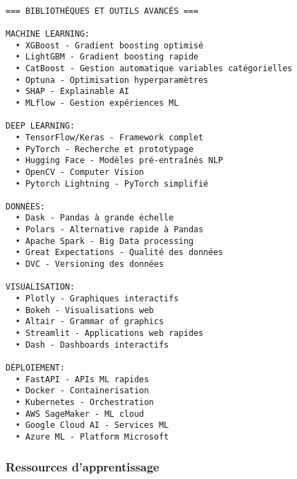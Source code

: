 \documentclass[11pt]{article}
\begin{document}
    \begin{Verbatim}[commandchars=\\\{\}]

=== BIBLIOTHÈQUES ET OUTILS AVANCÉS ===

MACHINE LEARNING:
  • XGBoost - Gradient boosting optimisé
  • LightGBM - Gradient boosting rapide
  • CatBoost - Gestion automatique variables catégorielles
  • Optuna - Optimisation hyperparamètres
  • SHAP - Explainable AI
  • MLflow - Gestion expériences ML

DEEP LEARNING:
  • TensorFlow/Keras - Framework complet
  • PyTorch - Recherche et prototypage
  • Hugging Face - Modèles pré-entraînés NLP
  • OpenCV - Computer Vision
  • Pytorch Lightning - PyTorch simplifié

DONNÉES:
  • Dask - Pandas à grande échelle
  • Polars - Alternative rapide à Pandas
  • Apache Spark - Big Data processing
  • Great Expectations - Qualité des données
  • DVC - Versioning des données

VISUALISATION:
  • Plotly - Graphiques interactifs
  • Bokeh - Visualisations web
  • Altair - Grammar of graphics
  • Streamlit - Applications web rapides
  • Dash - Dashboards interactifs

DÉPLOIEMENT:
  • FastAPI - APIs ML rapides
  • Docker - Containerisation
  • Kubernetes - Orchestration
  • AWS SageMaker - ML cloud
  • Google Cloud AI - Services ML
  • Azure ML - Platform Microsoft
    \end{Verbatim}

    \subsubsection{Ressources
d'apprentissage}\label{ressources-dapprentissage}
\end{document}
